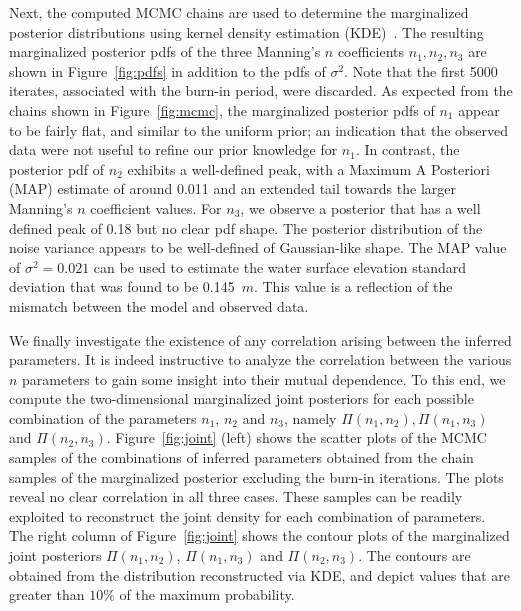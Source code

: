 \documentclass[review,12pt]{elsarticle}
\begin{document}
Next, the computed MCMC chains are used to determine the marginalized posterior 
distributions using kernel density estimation (KDE)~\citep{Parzen1962,Silverman1986}.  
The resulting marginalized posterior pdfs of the three Manning's $n$ coefficients 
$n_1,n_2,n_3$ are shown in Figure~\ref{fig:pdfs} in addition to the pdfs of $\sigma^2$. 
Note that the first 5000 iterates, associated with the burn-in period, were discarded.  
As expected from the chains shown in Figure~\ref{fig:mcmc}, the marginalized posterior 
pdfs of $n_1$ appear to be fairly flat, and similar to the uniform prior; an indication 
that the observed data were not useful to refine our prior knowledge for $n_1$. In 
contrast, the posterior pdf of $n_2$ exhibits a well-defined peak, with a Maximum A 
Posteriori (MAP) estimate of around 0.011 and an extended tail towards the larger 
Manning's $n$ coefficient values. For $n_3$, we observe a posterior that has a well 
defined peak of 0.18 but no clear pdf shape. The posterior distribution of the noise variance 
appears to be well-defined of Gaussian-like shape. The MAP value of $\sigma^2=0.021$ 
can be used to estimate the water surface elevation standard deviation that was found to 
be 0.145~$m$. This value is a reflection of the mismatch between the model and 
observed data.

We finally investigate the existence of any correlation arising between the inferred parameters.
It is indeed instructive to analyze the 
correlation between the various $n$ parameters to gain some insight into their mutual dependence.
To this end, we compute the two-dimensional marginalized joint posteriors for each 
possible combination of the parameters $n_1$, $n_2$ and $n_3$, namely $\Pi(n_1, n_2), \Pi(n_1, n_3)$ and $\Pi(n_2, n_3)$. Figure~\ref{fig:joint} (left) shows the scatter plots of the MCMC samples of the combinations of 
inferred parameters obtained from the chain samples of the marginalized posterior excluding 
the burn-in iterations. The plots reveal no clear correlation in all three cases. 
These samples can be readily exploited to reconstruct the joint density for each combination of parameters. 
The right column of Figure~\ref{fig:joint} shows the contour plots of the marginalized joint posteriors 
$\Pi(n_1, n_2)$, $\Pi(n_1, n_3)$ and $\Pi(n_2, n_3)$. The contours are obtained from the
distribution reconstructed via KDE, and depict values that are greater than $10\%$
of the maximum probability.
\end{document}
